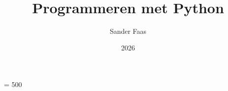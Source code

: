 
\usepackage{adjustbox}
\usepackage{caption}
\usepackage{cwpuzzle}
\usepackage{dashrule}
\usepackage[dutch]{babel}
\usepackage{enumitem}
\usepackage{etoolbox}
\usepackage{fontawesome5}
\usepackage{fontspec}
\usepackage{footnote}
\usepackage[edges]{forest}
\usepackage{graphicx}
\usepackage{listings}
\usepackage[os=win]{menukeys}
\usepackage{refcount}
\usepackage{siunitx}
\usepackage[skins]{tcolorbox}
\usepackage[countmax]{subfloat}
\usepackage{tabularray}
\usepackage{tikz}
\usepackage{unicode-math}
\usepackage{xcolor}
\usepackage{xr-hyper}
\usepackage{wrapfig}
\usepackage[hidelinks]{hyperref}
\usepackage[use-files]{xsim}

\usetikzlibrary{%
    arrows,
    arrows.meta, 
    backgrounds,
    fit,
    matrix, 
    positioning, 
    shapes.geometric, 
    shapes.symbols, 
    tikzmark,
}

\title{Programmeren met Python}
\author{Sander Faas}
\date{2026}


\makeatletter
\setlength{\@fptop}{0pt}
\makeatother



\settypeblocksize{22cm}{13cm}{*}
\setbinding{0.5cm}
\setlrmargins{3cm}{*}{*}
\setulmargins{4cm}{*}{*}
\setmarginnotes{17pt}{51pt}{\onelineskip}
\checkandfixthelayout
\setlength{\parindent}{0em}
\setlength{\parskip}{3pt}
\hyphenpenalty = 500 %
\raggedbottom %

